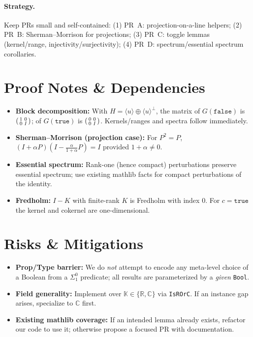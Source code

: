 \documentclass[11pt]{article}
\begin{document}
\paragraph{Strategy.}
Keep PRs small and self-contained:
(1) PR~A: projection-on-a-line helpers; (2) PR~B: Sherman--Morrison for projections; (3) PR~C: toggle lemmas (kernel/range, injectivity/surjectivity); (4) PR~D: spectrum/essential spectrum corollaries.

\section{Proof Notes \& Dependencies}\label{sec:notes}

\begin{itemize}
  \item \textbf{Block decomposition:} With \(H=\langle u\rangle\oplus \langle u\rangle^\perp\), the matrix of \(G(\texttt{false})\) is \(\begin{psmallmatrix}1&0\\0&I\end{psmallmatrix}\); of \(G(\texttt{true})\) is \(\begin{psmallmatrix}0&0\\0&I\end{psmallmatrix}\). Kernels/ranges and spectra follow immediately.
  \item \textbf{Sherman--Morrison (projection case):}
  For \(P^2=P\), \((I+\alpha P)(I-\frac{\alpha}{1+\alpha}P)=I\) provided \(1+\alpha\neq 0\).
  \item \textbf{Essential spectrum:} Rank-one (hence compact) perturbations preserve essential spectrum; use existing mathlib facts for compact perturbations of the identity.
  \item \textbf{Fredholm:} \(I-K\) with finite-rank \(K\) is Fredholm with index \(0\). For \(c=\texttt{true}\) the kernel and cokernel are one-dimensional.
\end{itemize}

\section{Risks \& Mitigations}\label{sec:risks}

\begin{itemize}
  \item \textbf{Prop/Type barrier:} We do \emph{not} attempt to encode any meta-level choice of a Boolean from a \(\Sigma^0_1\) predicate; all results are parameterized by a \emph{given} \texttt{Bool}.
  \item \textbf{Field generality:} Implement over \(\mathbb{K}\in\{\mathbb{R},\mathbb{C}\}\) via \texttt{IsROrC}. If an instance gap arises, specialize to \(\mathbb{C}\) first.
  \item \textbf{Existing mathlib coverage:} If an intended lemma already exists, refactor our code to use it; otherwise propose a focused PR with documentation.
\end{itemize}
\end{document}
